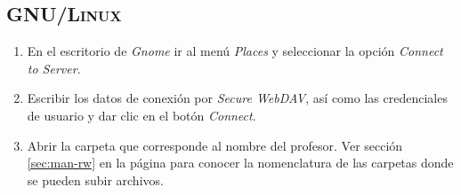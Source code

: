 {
 \linespread{1}
 \begin{table}[H]
 \caption{Formato de la \textsc{URL} de la secci\'{o}n de \textit{lectura y escritura}}{}
 \label{tab:csv-format}
 \noindent{} %
 \end{table}
}

      \subsection {\textsc{GNU/Linux}}
      \label{subsec:man-rw-gnulinux}

{
\linespread{0.1}
\begin{enumerate}

  \item En el escritorio de \textsl{Gnome} ir al men\'{u} \textsl{Places} y seleccionar la opci\'{o}n \textsl{Connect to Server}.


\newpage
  \item Escribir los datos de conexi\'{o}n por \textsl{Secure WebDAV}, as\'{i} como las credenciales de usuario y dar clic en el bot\'{o}n \textsl{Connect}.


  \item Abrir la carpeta que corresponde al nombre del profesor. Ver secci\'{o}n \ref{sec:man-rw} en la p\'{a}gina \pageref{sec:man-rw} para conocer la nomenclatura de las carpetas donde se pueden subir archivos.

\end{enumerate}
}

